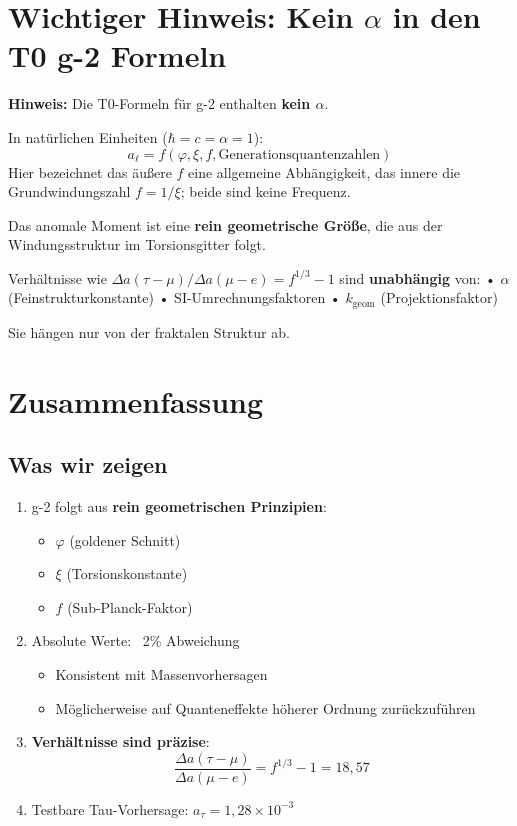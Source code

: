 	\section{Wichtiger Hinweis: Kein $\alpha$ in den T0 g-2 Formeln}
	
	\textbf{Hinweis:}
	Die T0-Formeln für g-2 enthalten \textbf{kein $\alpha$}.
	
	In natürlichen Einheiten ($\hbar = c = \alpha = 1$):
	\[ a_\ell = f(\varphi, \xi, f, \text{Generationsquantenzahlen}) \]
	Hier bezeichnet das äußere $f$ eine allgemeine Abhängigkeit, das innere die Grundwindungszahl $f = 1/\xi$; beide sind keine Frequenz.
	
	Das anomale Moment ist eine \textbf{rein geometrische Größe},
	die aus der Windungsstruktur im Torsionsgitter folgt.
	
	Verhältnisse wie $\Delta a(\tau-\mu)/\Delta a(\mu-e) = f^{1/3} - 1$ sind
	\textbf{unabhängig} von:
	• $\alpha$ (Feinstrukturkonstante)
	• SI-Umrechnungsfaktoren
	• $k_{\text{geom}}$ (Projektionsfaktor)
	
	Sie hängen nur von der fraktalen Struktur ab.
	\section{Zusammenfassung}
	
	\subsection{Was wir zeigen}
	
	\begin{enumerate}
		\item g-2 folgt aus \textbf{rein geometrischen Prinzipien}:
		\begin{itemize}
			\item $\varphi$ (goldener Schnitt)
			\item $\xi$ (Torsionskonstante)
			\item $f$ (Sub-Planck-Faktor)
		\end{itemize}
		
		\item Absolute Werte: ~2\% Abweichung
		\begin{itemize}
			\item Konsistent mit Massenvorhersagen
			\item Möglicherweise auf Quanteneffekte höherer Ordnung zurückzuführen
		\end{itemize}
		
		\item \textbf{Verhältnisse sind präzise}:
		\begin{equation}
			\frac{\Delta a(\tau - \mu)}{\Delta a(\mu - e)} = f^{1/3} - 1 = 18{,}57
		\end{equation}
		
		\item Testbare Tau-Vorhersage: $a_\tau = 1{,}28 \times 10^{-3}$
	\end{enumerate}
	
